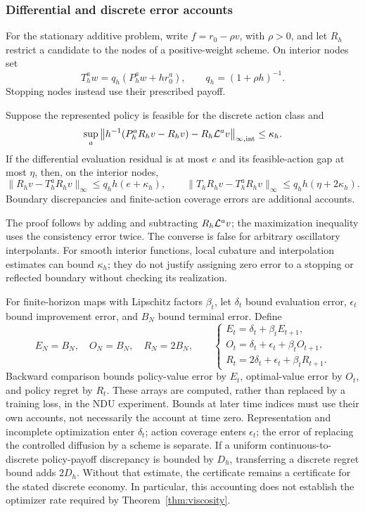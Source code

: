 \subsubsection{Differential and discrete error accounts}\label{sec:bridge-r6}
For the stationary additive problem, write $f=r_0-\rho v$, with $\rho>0$, and let $R_h$ restrict a candidate to the nodes of a positive-weight scheme. On interior nodes set
\[
 T_h^a w=q_h(P_h^aw+h r_0^a),\qquad q_h=(1+\rho h)^{-1}.
\]
Stopping nodes instead use their prescribed payoff.
\begin{proposition}\label{prop:bridge-r6}
Suppose the represented policy is feasible for the discrete action class and
\[
 \sup_a\left\|h^{-1}(P_h^aR_hv-R_hv)-R_h\mathcal L^av\right\|_{\infty,\mathrm{int}}\leq\kappa_h.
\]
If the differential evaluation residual is at most $e$ and its feasible-action gap at most $\eta$, then, on the interior nodes,
\[
 \|R_hv-T_h^aR_hv\|_\infty\leq q_hh(e+\kappa_h),\qquad
 \|T_hR_hv-T_h^aR_hv\|_\infty\leq q_hh(\eta+2\kappa_h).
\]
Boundary discrepancies and finite-action coverage errors are additional accounts.
\end{proposition}
The proof follows by adding and subtracting $R_h\mathcal L^av$; the maximization inequality uses the consistency error twice. The converse is false for arbitrary oscillatory interpolants. For smooth interior functions, local cubature and interpolation estimates can bound $\kappa_h$; they do not justify assigning zero error to a stopping or reflected boundary without checking its realization.

For finite-horizon maps with Lipschitz factors $\beta_t$, let $\delta_t$ bound evaluation error, $\epsilon_t$ bound improvement error, and $B_N$ bound terminal error. Define
\begin{equation}\label{eq:accounts-r6}
 E_N=B_N,\quad O_N=B_N,\quad R_N=2B_N,\qquad
 \begin{cases}
 E_t=\delta_t+\beta_t E_{t+1},\\
 O_t=\delta_t+\epsilon_t+\beta_t O_{t+1},\\
 R_t=2\delta_t+\epsilon_t+\beta_t R_{t+1}.
 \end{cases}
\end{equation}
Backward comparison bounds policy-value error by $E_t$, optimal-value error by $O_t$, and policy regret by $R_t$. These arrays are computed, rather than replaced by a training loss, in the NDU experiment. Bounds at later time indices must use their own accounts, not necessarily the account at time zero. Representation and incomplete optimization enter $\delta_t$; action coverage enters $\epsilon_t$; the error of replacing the controlled diffusion by a scheme is separate. If a uniform continuous-to-discrete policy-payoff discrepancy is bounded by $D_h$, transferring a discrete regret bound adds $2D_h$. Without that estimate, the certificate remains a certificate for the stated discrete economy. In particular, this accounting does not establish the optimizer rate required by Theorem~\ref{thm:viscosity}.

